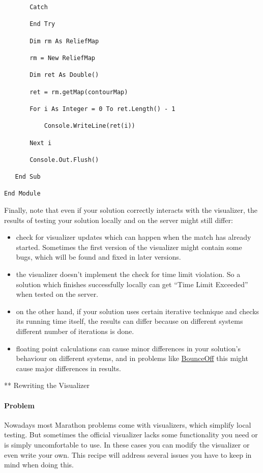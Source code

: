 \documentclass[]{article}
\let\oldparagraph\paragraph
\renewcommand{\paragraph}[1]{\oldparagraph{#1}\mbox{}}
\begin{document}
\begin{verbatim}
       Catch

       End Try

       Dim rm As ReliefMap

       rm = New ReliefMap

       Dim ret As Double()

       ret = rm.getMap(contourMap)

       For i As Integer = 0 To ret.Length() - 1

           Console.WriteLine(ret(i))

       Next i

       Console.Out.Flush()

   End Sub

End Module
\end{verbatim}

Finally, note that even if your solution correctly interacts with the
visualizer, the results of testing your solution locally and on the
server might still differ:

\begin{itemize}
\item
  check for visualizer updates which can happen when the match has
  already started. Sometimes the first version of the visualizer might
  contain some bugs, which will be found and fixed in later versions.
\item
  the visualizer doesn't implement the check for time limit violation.
  So a solution which finishes successfully locally can get ``Time Limit
  Exceeded'' when tested on the server.
\item
  on the other hand, if your solution uses certain iterative technique
  and checks its running time itself, the results can differ because on
  different systems different number of iterations is done.
\item
  floating point calculations can cause minor differences in your
  solution's behaviour on different systems, and in problems like
  \href{http://apps.topcoder.com/forums/?module=Thread\&threadID=670892\&start=0}{BounceOff}
  this might cause major differences in results.
\end{itemize}

** Rewriting the Visualizer

\hypertarget{problem-2}{%
\paragraph{Problem}\label{problem-2}}

Nowadays most Marathon problems come with visualizers, which simplify
local testing. But sometimes the official visualizer lacks some
functionality you need or is simply uncomfortable to use. In these cases
you can modify the visualizer or even write your own. This recipe will
address several issues you have to keep in mind when doing this.
\end{document}
